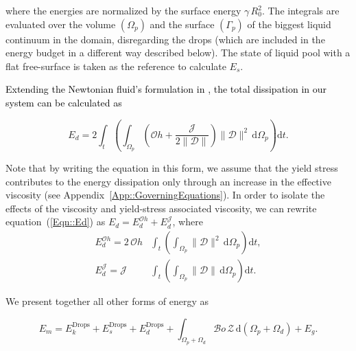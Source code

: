 \documentclass[final]{jfm}
\newcommand*\red{\textcolor{black}}
\begin{document}
\noindent where the energies are normalized by the surface energy $\gamma \, R_0^2$. The integrals are evaluated over the volume $\left(\Omega_p\right)$ and the surface $\left(\Gamma_p\right)$ of the biggest liquid continuum in the domain, disregarding the drops (which are included in the energy budget in a different way described below). The state of liquid pool with a flat free-surface is taken as the reference to calculate $E_s$. 

\red{Extending the Newtonian fluid's formulation in \citet[p.~50-51]{landau2013course}, the total dissipation in our system can be calculated as}

\begin{equation}\label{Eqn::Ed}
	E_d = 2\int_t\left(\int_{\Omega_p}\left(\mathcal{O}h + \frac{\mathcal{J}}{2\|\boldsymbol{\mathcal{D}}\|}\right)\|\boldsymbol{\mathcal{D}}\|^2\,\mathrm{d}\Omega_p\right)\mathrm{d}t.
\end{equation}

\noindent Note that by writing the equation in this form, we assume that the yield stress contributes to the energy dissipation only through an increase in the effective viscosity (see Appendix~\ref{App::GoverningEquations}). In order to isolate the effects of the viscosity and yield-stress associated viscosity, we can rewrite equation~(\ref{Eqn::Ed}) as $E_d = E_d^{\mathcal{O}h} + E_d^\mathcal{J}$, where
\begin{align}
	\label{Eqn::EdOh}
	E_d^{\mathcal{O}h} = 2\, \mathcal{O}h&\int_t\left(\int_{\Omega_p}\|\boldsymbol{\mathcal{D}}\|^2\,\mathrm{d}\Omega_p\right)\mathrm{d}t,\\
	\label{Eqn::EdJ}
	E_d^\mathcal{J} = \mathcal{J}&\int_t\left(\int_{\Omega_p}\|\boldsymbol{\mathcal{D}}\|\,\mathrm{d}\Omega_p\right)\mathrm{d}t.
\end{align}

We present together all other forms of energy as

\begin{equation}\label{Eqn::Em}
	E_m = E_k^\text{Drops} + E_s^\text{Drops} + E_d^\text{Drops} + \int_{\Omega_p+\Omega_d}\mathcal{B}o\,\mathcal{Z}\,\mathrm{d}\left(\Omega_p+\Omega_d\right)  + E_g. 
\end{equation}
\end{document}
